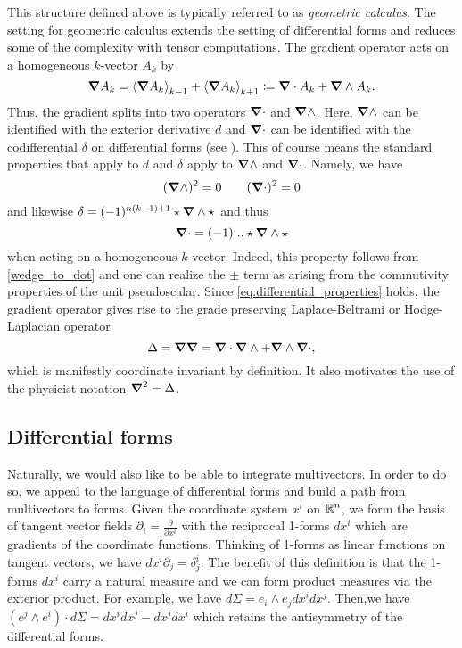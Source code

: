 \documentclass[12pt]{article}
\begin{document}
This structure defined above is typically referred to as \emph{geometric calculus}.  The setting for geometric calculus extends the setting of differential forms and reduces some of the complexity with tensor computations.  The gradient operator acts on a homogeneous $k$-vector $A_k$ by
\[
\grad A_k = \proj{k-1}{\grad A_k} + \proj{k+1}{\grad A_k} \coloneqq \grad \cdot A_k + \grad \wedge A_k.
\]
Thus, the gradient splits into two operators $\grad \cdot$ and $\grad \wedge$.  Here, $\grad \wedge$ can be identified with the exterior derivative $d$ and $\grad \cdot$ can be identified with the codifferential $\delta$ on differential forms (see \cite{schindler_geometric_2020}). This of course means the standard properties that apply to $d$ and $\delta$ apply to $\grad \wedge$ and $\grad \cdot$. Namely, we have
\begin{equation}
\label{eq:differential_properties}
(\grad \wedge)^2=0 \qquad (\grad \cdot)^2 = 0 
\end{equation}
and likewise $\delta = (-1)^{n(k-1)+1}\star \grad \wedge \star$ and thus 
\begin{equation}
\grad \cdot = (-1)^... \star \grad \wedge \star 
\end{equation}
when acting on a homogeneous $k$-vector. Indeed, this property follows from \ref{wedge_to_dot} and one can realize the $\pm$ term as arising from the commutivity properties of the unit pseudoscalar. Since \ref{eq:differential_properties} holds, the gradient operator gives rise to the grade preserving Laplace-Beltrami or Hodge-Laplacian operator
\[
\Delta = \grad \grad = \grad \cdot \grad \wedge + \grad \wedge \grad \cdot,
\]
which is manifestly coordinate invariant by definition.  It also motivates the use of the physicist notation $\grad^2=\Delta$.

\subsection{Differential forms}

Naturally, we would also like to be able to integrate multivectors.  In order to do so, we appeal to the language of differential forms and build a path from multivectors to forms. Given the coordinate system $x^i$ on $\R^n$, we form the basis of tangent vector fields $\partial_i = \frac{\partial}{\partial x^i}$ with the reciprocal 1-forms $dx^i$ which are gradients of the coordinate functions.  Thinking of 1-forms as linear functions on tangent vectors, we have $dx^i  \partial_j = \delta^i_j$.  The benefit of this definition is that the 1-forms $dx^i$ carry a natural measure and we can form product measures via the exterior product.  For example, we have $d\Sigma = e_i \wedge e_j dx^i dx^j$.  Then,we have $(e^j \wedge e^i)\cdot d\Sigma = dx^idx^j - dx^j dx^i$ which retains the antisymmetry of the differential forms. 
\end{document}

